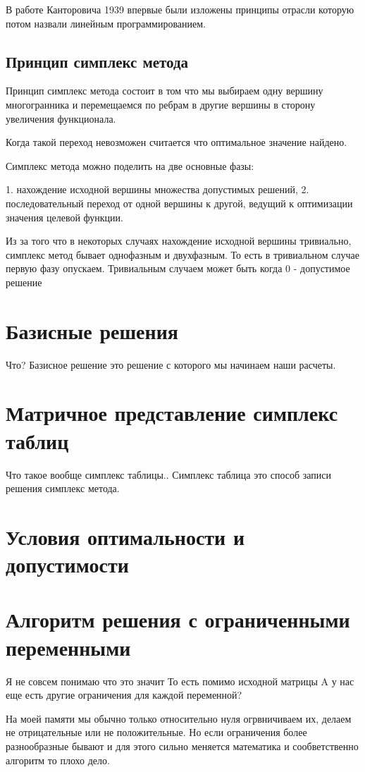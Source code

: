 \documentclass[a4paper,article,14pt]{extarticle}
\begin{document}
В работе Канторовича 1939 впервые были изложены принципы отрасли которую потом назвали линейным программированием.

\subsection{Принцип симплекс метода}

Принцип симплекс метода состоит в том что мы выбираем одну вершину многогранника и перемещаемся по ребрам в другие вершины в сторону увеличения функционала.

Когда такой переход невозможен считается что оптимальное значение найдено.

Симплекс метода можно поделить на две основные фазы:

1. нахождение исходной вершины множества допустимых решений,
2. последовательный переход от одной вершины к другой, ведущий к оптимизации значения целевой функции.

Из за того что в некоторых случаях нахождение исходной вершины тривиально, симплекс метод бывает однофазным и двухфазным.
То есть в тривиальном случае первую фазу опускаем.
Тривиальным случаем может быть когда 0 - допустимое решение

\section{Базисные решения}

Что?
Базисное решение это решение с которого мы начинаем наши расчеты.

\section{Матричное представление симплекс таблиц}

Что такое вообще симплекс таблицы..
Симплекс таблица это способ записи решения симплекс метода.

\section{Условия оптимальности и допустимости}

\section{Алгоритм решения с ограниченными переменными}

Я не совсем понимаю что это значит
То есть помимо исходной матрицы A у нас еще есть другие ограничения для каждой переменной?

На моей памяти мы обычно только относительно нуля огрвничиваем их, делаем не отрицательные или не положительные.
Но если ограничения более разнообразные бывают и для этого сильно меняется математика и сообветственно алгоритм то плохо дело.
\end{document}
